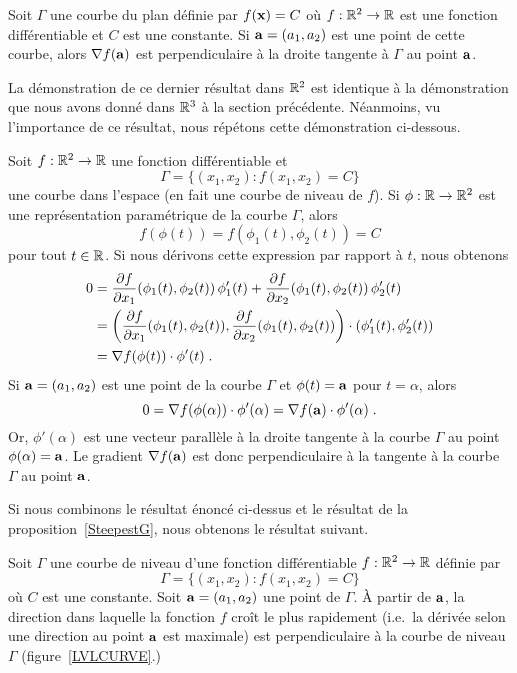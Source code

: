 {\begin{prop}
Soit $\Gamma$ une courbe du plan définie par $f(\mathbf{x})=C$ où
$f:\mathbb{R}^2\rightarrow \mathbb{R}$ est une fonction différentiable et $C$ est une
constante.  Si $\mathbf{a} = (a_1,a_2)$ est une point de cette courbe,
alors $\nabla f(\mathbf{a})$ est perpendiculaire à la droite tangente à
$\Gamma$ au point $\mathbf{a}$.
\end{prop}

La démonstration de ce dernier résultat dans $\mathbb{R}^2$ est identique à la
démonstration que nous avons donné dans $\mathbb{R}^3$ à la section précédente.
Néanmoins, vu l'importance de ce résultat, nous répétons cette démonstration
ci-dessous.

Soit $f:\mathbb{R}^2\rightarrow \mathbb{R}$ une fonction différentiable et
\[
\Gamma = \{ (x_1,x_2) : f(x_1,x_2)= C \}
\]
une courbe dans l'espace (en fait une courbe de niveau de $f$).  Si
$\phi:\mathbb{R}\rightarrow \mathbb{R}^2$ est une représentation paramétrique de la
courbe $\Gamma$, alors
\[
f(\phi(t)) = f(\phi_1(t) , \phi_2(t)) = C
\]
pour tout $t\in\mathbb{R}$.  Si nous dérivons cette expression par rapport à
$t$, nous obtenons
\begin{align*}
0 &= \frac{\partial f}{\partial x_1}(\phi_1(t),\phi_2(t))\, \phi_1'(t)
+ \frac{\partial f}{\partial x_2}(\phi_1(t),\phi_2(t))\, \phi_2'(t) \\
&= \left(\frac{\partial f}{\partial x_1}(\phi_1(t),\phi_2(t)),
\frac{\partial f}{\partial x_2}(\phi_1(t),\phi_2(t))\right) \cdot (\phi_1'(t),\phi_2'(t)) \\
&= \nabla f(\phi(t))\cdot \phi'(t) \; .
\end{align*}
Si $\mathbf{a} = (a_1,a_2)$ est une point de la courbe $\Gamma$ et
$\phi(t) = \mathbf{a}$ pour  $t=\alpha$, alors
\[
0 = \nabla f(\phi(\alpha))\cdot \phi'(\alpha)
= \nabla f(\mathbf{a})\cdot \phi'(\alpha) \; .
\]
Or, $\phi'(\alpha)$ est une vecteur parallèle à la droite tangente à la
courbe $\Gamma$ au point $\phi(\alpha)=\mathbf{a}$.  Le gradient
$\nabla f(\mathbf{a})$ est donc perpendiculaire à la tangente à la courbe
$\Gamma$ au point $\mathbf{a}$.

Si nous combinons le résultat énoncé ci-dessus et le résultat de la
proposition~\ref{SteepestG}, nous obtenons le résultat suivant.

\begin{prop}
Soit $\Gamma$ une courbe de niveau d'une fonction différentiable
$f:\mathbb{R}^2\rightarrow \mathbb{R}$ définie par
\[
\Gamma = \{ (x_1,x_2) : f(x_1,x_2) = C \}
\]
où $C$ est une constante.  Soit $\mathbf{a}=(a_1,a_2)$ une point de
$\Gamma$.  À partir de $\mathbf{a}$, la direction dans laquelle la
fonction $f$ croît le plus rapidement (i.e.\ la dérivée selon une
direction au point $\mathbf{a}$ est maximale) est perpendiculaire à la
courbe de niveau $\Gamma$ (figure~\ref{LVLCURVE}.)
\end{prop}

}
